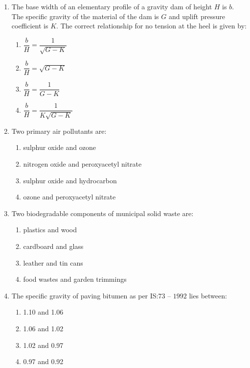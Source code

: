 \documentclass[journal]{IEEEtran}
\begin{document}
\begin{enumerate}
\item The base width of an elementary profile of a gravity dam of height $H$ is $b$. The specific gravity of the material of the dam is $G$ and uplift pressure coefficient is $K$. The correct relationship for no tension at the heel is given by: \textbf{}
\begin{multicols}{2}
\begin{enumerate}
\item $\dfrac{b}{H} = \dfrac{1}{\sqrt{G - K}}$ 
\item $\dfrac{b}{H} = \sqrt{G - K}$
\item $\dfrac{b}{H} = \dfrac{1}{G - K}$
\item $\dfrac{b}{H} = \dfrac{1}{K \sqrt{G - K}}$
\end{enumerate}
\end{multicols}

\item Two primary air pollutants are: \textbf{}
\begin{multicols}{2}
\begin{enumerate}
\item sulphur oxide and ozone  
\item nitrogen oxide and peroxyacetyl nitrate  
\item sulphur oxide and hydrocarbon  
\item ozone and peroxyacetyl nitrate
\end{enumerate}
\end{multicols}

\item Two biodegradable components of municipal solid waste are: \textbf{}
\begin{multicols}{2}
\begin{enumerate}
\item plastics and wood
\item cardboard and glass
\item leather and tin cans 
\item food wastes and garden trimmings
\end{enumerate}
\end{multicols}

\item The specific gravity of paving bitumen as per IS:$73$ -- $1992$ lies between: \textbf{}
\begin{multicols}{2}
\begin{enumerate}
\item 1.10 and 1.06  
\item 1.06 and 1.02  
\item 1.02 and 0.97  
\item 0.97 and 0.92
\end{enumerate}
\end{multicols}


\end{enumerate}
\end{document}
